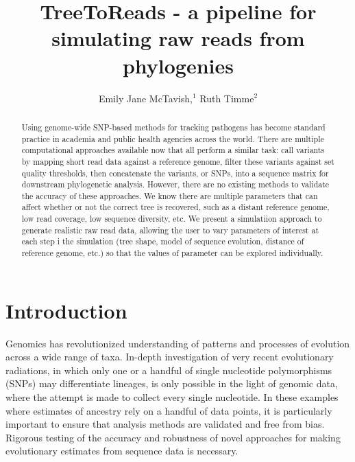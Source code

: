 \documentclass{bioinfo}
\newcommand{\mytitle}[2]{\title[#1]{#2}}
\newcommand{\myauthor}[2]{\author[#1]{#2}}
\newcommand{\myaddress}[1]{\address{#1}}
\newcommand{\posttitle}[2]{}
\newcommand{\authorswaffil}{Emily Jane McTavish,$^{1}$
   Ruth Timme$^{2}$
}
\newcommand{\affil}{$^{1}$Department of Ecology and Evolutionary Biology, University of Kansas, Lawrence KS, USA\\
$^{2}$ Center for Food Safety and Nutrition, Food and Drug Administration\\
}
\begin{document}
\mytitle{Trer to Reads}{TreeToReads - a pipeline for simulating raw reads from phylogenies}

\myauthor{McTavish \textit{et~al}}{\authorswaffil}
\myaddress{\affil}
\maketitle
\posttitle{\authorswaffil}{\affil}


\begin{abstract}
Using genome-wide SNP-based methods for tracking pathogens has become standard practice in academia and public health agencies across the world. 
There are multiple computational approaches available now that all perform a similar task: call variants by mapping short read data against a reference genome, filter these variants against set quality thresholds, then concatenate the variants, or SNPs, into a sequence matrix for downstream phylogenetic analysis. However, there are no existing methods to validate the accuracy of these approaches. 
We know there are multiple parameters that can affect whether or not the correct tree is recovered, such as a distant reference genome, low read coverage, low sequence diversity, etc. 
We present a simulatiion approach to generate realistic raw read data, allowing the user to vary  parameters of interest at each step i the simulation (tree shape, model of sequence evolution, distance of reference genome, etc.) so that the values of parameter can be explored individually.

\end{abstract}

\section{Introduction}
Genomics has revolutionized understanding of patterns and processes of evolution across a wide range of taxa.
In-depth investigation of very recent evolutionary radiations, in which only one or a handful of single nucleotide polymorphisms (SNPs) may differentiate lineages, 
is only possible in the light of genomic data, where the attempt is made to collect every single nucleotide.
In these examples where estimates of ancestry rely on a handful of data points, it is particularly important to ensure that analysis methods are validated and free from bias. 
Rigorous testing of the accuracy and robustness of novel approaches for making evolutionary estimates
from sequence data is necessary.
\end{document}
